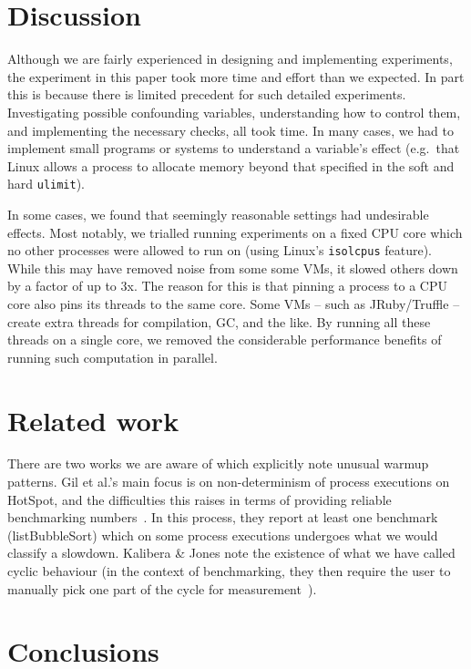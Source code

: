 \documentclass[a4paper,UKenglish]{lipics}
\newcommand{\kalibera}{Kalibera \& Jones\xspace}
\begin{document}
\section{Discussion}
\label{sec:Discussion}

Although we are fairly experienced in designing and implementing
experiments, the experiment in this paper took more time and effort than we
expected. In part this is because there is limited precedent for such detailed
experiments. Investigating possible confounding variables, understanding how to
control them, and implementing the necessary checks, all took time. In many
cases, we had to implement small programs or systems to understand a variable's
effect (e.g.~that Linux allows a process to allocate memory beyond that
specified in the soft and hard \texttt{ulimit}).

In some cases, we found that seemingly reasonable settings had undesirable
effects. Most notably, we trialled running experiments on a fixed CPU core which
no other processes were allowed to run on (using Linux's \texttt{isolcpus}
feature). While this may have removed noise from some some VMs,
it slowed others down by
a factor of up to 3x. The reason for this is that pinning a process to a CPU
core also pins its threads to the same core. Some VMs -- such as
JRuby/Truffle -- create extra threads for compilation, GC, and the like. By
running all these threads on a single core, we removed the considerable
performance benefits of running such computation in parallel.


\section{Related work}

There are two works we are aware of which explicitly note unusual warmup
patterns. Gil et al.'s main focus is on non-determinism of process executions on
HotSpot, and the difficulties this raises in terms of providing reliable
benchmarking numbers~\cite{gil11microbenchmark}. In this process, they report at
least one benchmark (listBubbleSort) which on some process executions undergoes what we
would classify a slowdown. \kalibera note the
existence of what we have called cyclic behaviour (in the context of benchmarking,
they then require the user to
manually pick one part of the cycle for measurement~\cite{kalibera13rigorous}).


\section{Conclusions}
\label{sec:conclusion}
\end{document}
